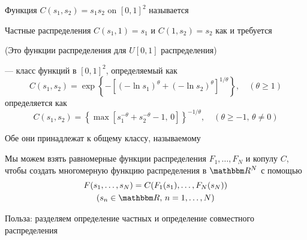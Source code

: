 \begin{frame}

    \vspace{2em}
    \Eg Функция $C(s_1, s_2) = s_1 s_2$ on $[0, 1]^2$ называется
    
    \vspace{1em}
    Частные распределения $C(s_1, 1) =
    s_1$ и $C(1, s_2) = s_2$ как и требуется
    
    (Это функции распределения для
    $U[0, 1]$ распределения)

\end{frame}

\begin{frame}

    \vspace{2em}
    \Eg
     --- класс функций в $[0, 1]^2$, определяемый как
    \begin{equation*}
        C(s_1, s_2) = 
        \exp 
        \left\{
            - \left[ 
                (-\ln s_1)^\theta + (-\ln s_2)^\theta
            \right]^{1/\theta}
        \right\}
        , \quad (\theta \geq 1)
    \end{equation*}
     определяется как
    \begin{equation*}
        C(s_1, s_2) = 
        \left\{
            \max \left[
                s_1^{-\theta} +  s_2^{-\theta} -1, \, 0
                \right]
        \right\}^{-1/\theta}
        ,\quad (\theta \geq -1, \, \theta \not= 0)
    \end{equation*}
   
    Обе они принадлежат к общему классу, называемому 

\end{frame}

\begin{frame}

    \vspace{2em}
    Мы можем взять равномерные функции распределения
    $F_1, \ldots, F_N$ и копулу $C$, чтобы создать многомерную функцию распределения в
    $\RR^N$ с помощью
    \begin{multline}
        \label{eq:ffcop}
        F(s_1, \ldots, s_N) = C(F_1(s_1), \ldots, F_N(s_N))
        \\ (s_n \in \RR, \, n=1, \ldots, N)
    \end{multline}
    
    \vspace{1em}
    Польза: разделяем определение частных и определение совместного распределения
    
\end{frame}

